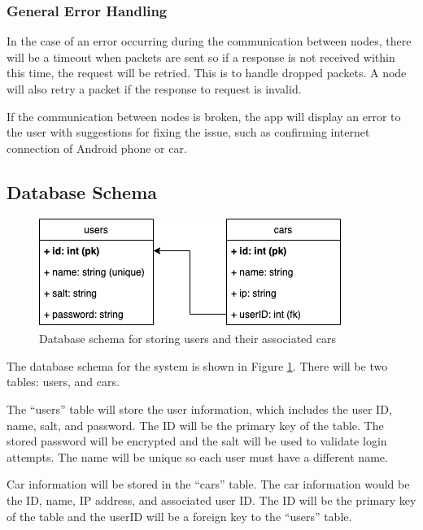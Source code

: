 \documentclass[letterpaper,12pt]{report}
\begin{document}
    \subsubsection{General Error Handling}

    In the case of an error occurring during the communication between nodes,
    there will be a timeout when packets are sent so if a response is not
    received within this time, the request will be retried. This is to handle
    dropped packets. A node will also retry a packet if the response to request
    is invalid.

    If the communication between nodes is broken, the app will display an error
    to the user with suggestions for fixing the issue, such as confirming
    internet connection of Android phone or car.

    \subsection{Database Schema}

    \begin{figure}[H]
        \centering
        \includegraphics[width=0.7\linewidth]{diagrams/Design_Database_Schema.png}
        \caption{Database schema for storing users and their associated cars}
        \label{fig:database}
    \end{figure}

    The database schema for the system is shown in Figure \ref{fig:database}.
    There will be two tables: users, and cars.

    The “users” table will store the user information, which includes the user
    ID, name, salt, and password. The ID will be the primary key of the table.
    The stored password will be encrypted and the salt will be used to validate
    login attempts. The name will be unique so each user must have a different
    name.

    Car information will be stored in the “cars” table. The car information
    would be the ID, name, IP address, and associated user ID. The ID will be
    the primary key of the table and the userID will be a foreign key to the
    “users” table.
\end{document}
